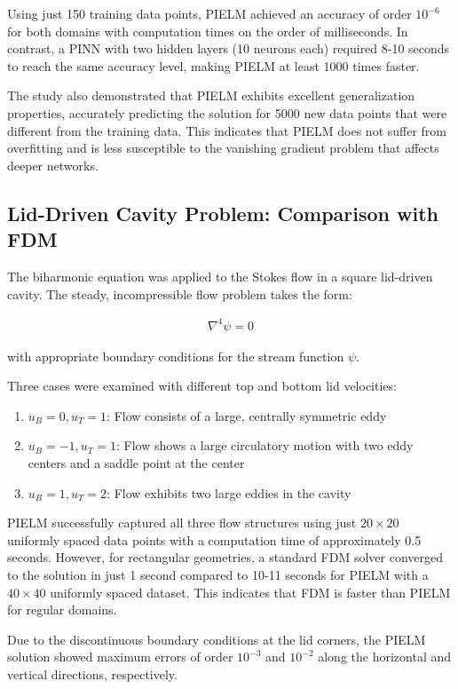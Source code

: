 \documentclass[11pt]{article}
\begin{document}
Using just 150 training data points, PIELM achieved an accuracy of order $10^{-6}$ for both domains with computation times on the order of milliseconds. In contrast, a PINN with two hidden layers (10 neurons each) required 8-10 seconds to reach the same accuracy level, making PIELM at least 1000 times faster.

The study also demonstrated that PIELM exhibits excellent generalization properties, accurately predicting the solution for 5000 new data points that were different from the training data. This indicates that PIELM does not suffer from overfitting and is less susceptible to the vanishing gradient problem that affects deeper networks.

\subsection{Lid-Driven Cavity Problem: Comparison with FDM}

The biharmonic equation was applied to the Stokes flow in a square lid-driven cavity. The steady, incompressible flow problem takes the form:

\begin{align}
\nabla^4 \psi = 0
\end{align}

with appropriate boundary conditions for the stream function $\psi$.

Three cases were examined with different top and bottom lid velocities:
\begin{enumerate}
    \item $u_B = 0, u_T = 1$: Flow consists of a large, centrally symmetric eddy
    \item $u_B = -1, u_T = 1$: Flow shows a large circulatory motion with two eddy centers and a saddle point at the center
    \item $u_B = 1, u_T = 2$: Flow exhibits two large eddies in the cavity
\end{enumerate}

PIELM successfully captured all three flow structures using just $20 \times 20$ uniformly spaced data points with a computation time of approximately 0.5 seconds. However, for rectangular geometries, a standard FDM solver converged to the solution in just 1 second compared to 10-11 seconds for PIELM with a $40 \times 40$ uniformly spaced dataset. This indicates that FDM is faster than PIELM for regular domains.

Due to the discontinuous boundary conditions at the lid corners, the PIELM solution showed maximum errors of order $10^{-3}$ and $10^{-2}$ along the horizontal and vertical directions, respectively.
\end{document}
